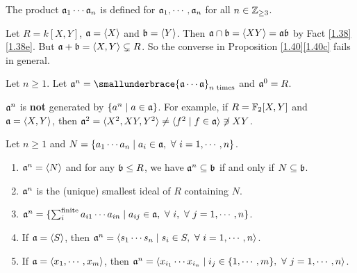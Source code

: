\begin{remark}
    The product $\mathfrak{a}_1 \cdots \mathfrak{a}_n$ is defined for $\mathfrak{a}_1,\cdots,\mathfrak{a}_n$ for all $n \in \mathbb{Z}_{\geq 3}$.
\end{remark}

\begin{example}\label{1.41}
    Let $R = k[X,Y]$, $\mathfrak{a} = \langle X \rangle$ and $\mathfrak{b} = \langle Y \rangle$. Then $\mathfrak{a} \cap \mathfrak{b} = \langle XY \rangle = \mathfrak{a} \mathfrak{b}$ by Fact \ref{1.38}\ref{1.38e}. But $\mathfrak{a} + \mathfrak{b} = \langle X,Y \rangle \subsetneq R$. So the converse in Proposition \ref{1.40}\ref{1.40c} fails in general.
\end{example}

\begin{definition}\label{1.42}
    Let $n \geq 1$. Let $\ffa^n = \smallunderbrace{\ffa \cdots \ffa}_{n\text{ times}}$ and $\mathfrak{a}^0 = R$.
\end{definition}

\begin{warning}\label{1.43}
    $\mathfrak{a}^n$ is \textbf{not} generated by $\{a^n \mid a \in \mathfrak{a}\}$. For example, if $R = \mathbb{F}_2[X,Y]$ and $\mathfrak{a} = \langle X,Y \rangle$, then $\mathfrak{a}^2 = \langle X^2,XY,Y^2 \rangle \neq \langle f^2 \mid f \in \mathfrak{a} \rangle \not \ni XY$.
\end{warning}

\begin{fact}\label{1.44}
    Let $n \geq 1$ and $N = \{a_1 \cdots a_n \mid a_i \in \mathfrak{a}, \ \forall \  i = 1,\cdots,n\}$.
    \begin{enumerate}
        \item
            $\mathfrak{a}^n = \langle N \rangle$ and for any $\mathfrak{b} \leq R$, we have $\mathfrak{a}^n \subseteq \mathfrak{b}$ if and only if $N \subseteq \mathfrak{b}$.
        \item 
            $\mathfrak{a}^n$ is the (unique) smallest ideal of $R$ containing $N$.
        \item $\mathfrak{a}^n = \{\sum_{i}^{\text{finite}}a_{i1} \cdots a_{in} \mid a_{ij} \in \mathfrak{a}, \ \forall \  i, \ \forall \  j = 1,\cdots,n\}$.
        \item If $\mathfrak{a} = \langle S \rangle$, then $\mathfrak{a}^n = \langle s_1 \cdots s_n \mid s_i \in S, \ \forall \  i = 1,\cdots,n\rangle$.
        \item 
            If $\mathfrak{a} = \langle x_1,\cdots,x_m \rangle$, then $\mathfrak{a}^n = \langle x_{i_1} \cdots x_{i_n} \mid i_j \in \{1,\cdots,m\}, \ \forall \  j = 1,\cdots,n \rangle$.
    \end{enumerate}
\end{fact}


